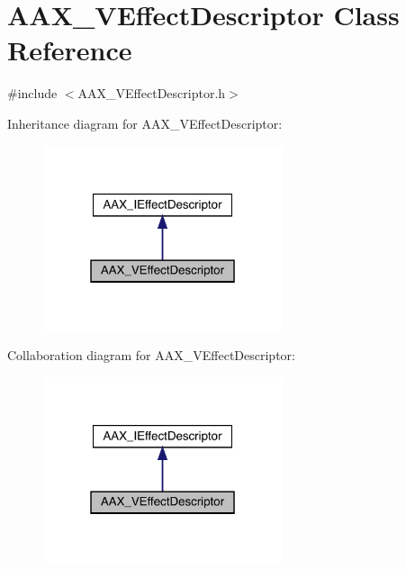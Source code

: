 \hypertarget{a01913}{}\section{A\+A\+X\+\_\+\+V\+Effect\+Descriptor Class Reference}
\label{a01913}


{\ttfamily \#include $<$A\+A\+X\+\_\+\+V\+Effect\+Descriptor.\+h$>$}



Inheritance diagram for A\+A\+X\+\_\+\+V\+Effect\+Descriptor\+:
\nopagebreak
\begin{figure}[H]
\begin{center}
\leavevmode
\includegraphics[width=199pt]{a01912}
\end{center}
\end{figure}


Collaboration diagram for A\+A\+X\+\_\+\+V\+Effect\+Descriptor\+:
\nopagebreak
\begin{figure}[H]
\begin{center}
\leavevmode
\includegraphics[width=199pt]{a01911}
\end{center}
\end{figure}


